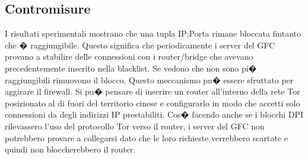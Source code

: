 \subsection{Contromisure}
I risultati sperimentali \cite{gfc} mostrano che una tupla IP:Porta rimane bloccata fintanto che � raggiungibile. Questo significa che periodicamente i server del GFC provano a stabilire delle connessioni con i router/bridge che avevano precedentemente inserito nella blacklist. Se vedono che non sono pi� raggiungibili rimuovono il blocco. Questo meccanismo pu� essere sfruttato per aggirare il firewall. Si pu� pensare di inserire un router all'interno della rete Tor posizionato al di fuori del territorio cinese e configurarlo in modo che accetti solo connessioni da degli indirizzi IP prestabiliti. Cos� facendo anche se i blocchi DPI rilevassero l'uso del protocollo Tor verso il router, i server del GFC non potrebbero provare a collegarsi dato che le loro richieste verrebbero scartate e quindi non bloccherebbero il router.

